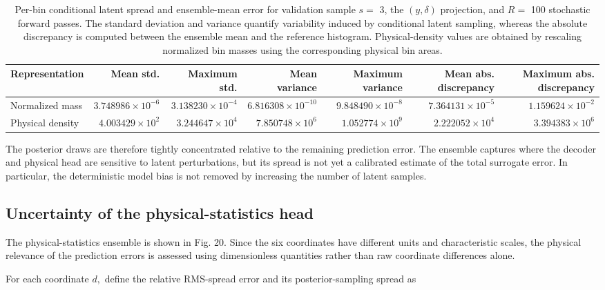 \begin{table}[!htbp]
\centering\small
\caption{Per-bin conditional latent spread and ensemble-mean error for validation sample \(s =\) 3, the \(( y , \delta )\) projection, and \(R =\) 100 stochastic forward passes. The standard deviation and variance quantify variability induced by conditional latent sampling, whereas the absolute discrepancy is computed between the ensemble mean and the reference histogram. Physical-density values are obtained by rescaling normalized bin masses using the corresponding physical bin areas.}
\label{tab:11}
\begin{adjustbox}{max width=\linewidth}
\begin{tabular}{lrrrrrr}\toprule
Representation & Mean std. & Maximum std. & Mean variance & Maximum variance & Mean abs. discrepancy & Maximum abs. discrepancy\\\midrule
Normalized mass & $3.748986\times10^{-6}$ & $3.138230\times10^{-4}$ & $6.816308\times10^{-10}$ & $9.848490\times10^{-8}$ & $7.364131\times10^{-5}$ & $1.159624\times10^{-2}$\\
Physical density & $4.003429\times10^2$ & $3.244647\times10^4$ & $7.850748\times10^6$ & $1.052774\times10^9$ & $2.222052\times10^4$ & $3.394383\times10^6$\\\bottomrule\end{tabular}
\end{adjustbox}
\end{table}

The posterior draws are therefore tightly concentrated relative to the remaining prediction error. The ensemble captures where the decoder and physical head are sensitive to latent perturbations, but its spread is not yet a calibrated estimate of the total surrogate error. In particular, the deterministic model bias is not removed by increasing the number of latent samples.

\subsection{Uncertainty of the physical-statistics head}
\label{sec:05_results_uncertainty_of_the_physical_statistics_head}

The physical-statistics ensemble is shown in Fig. 20. Since the six coordinates have different units and characteristic scales, the physical relevance of the prediction errors is assessed using dimensionless quantities rather than raw coordinate differences alone.

For each coordinate \(d ,\) define the relative RMS-spread error and its posterior-sampling spread as

